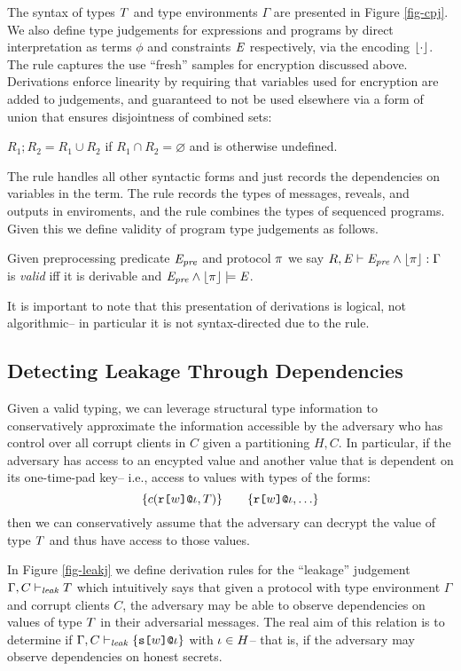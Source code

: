 \cpjfig

The syntax of types $T$ and type environments $\Gamma$ are presented
in Figure \ref{fig-cpj}. We also
define type judgements for expressions and programs by direct
interpretation as terms $\phi$ and constraints $\mathit{E}$ respectively,
via the encoding $\lfloor \cdot \rfloor$. The  rule captures
the use ``fresh'' samples for encryption discussed above. Derivations
enforce linearity by requiring that variables used for encryption
are added to judgements, and guaranteed to not be used elsewhere
via a form of union that ensures disjointness of combined sets:
\begin{definition}
  $R_1;R_2 = R_1 \cup R_2$ if $R_1 \cap R_2 = \varnothing$ and is otherwise
  undefined.
\end{definition}
The  rule handles all other syntactic forms and just
records the dependencies on variables in the term.  The 
rule records the types of messages, reveals, and outputs in
enviroments, and the  rule combines the types of
sequenced programs.  Given this we define validity of program type
judgements as follows. 
\begin{definition}
  Given preprocessing predicate $\mathit{E}_{\mathit{pre}}$ and protocol $\pi$ we say
  $R,\mathit{E} \vdash \mathit{E}_{\mathit{pre}} \wedge \lfloor \pi \rfloor : \Gamma$ is \emph{valid} iff it is derivable and
  $\mathit{E}_{\mathit{pre}} \wedge \lfloor \pi \rfloor \models \mathit{E}$.
\end{definition}
It is important to note that this presentation of derivations is
logical, not algorithmic-- in particular it is not syntax-directed
due to the  rule.

\subsection{Detecting Leakage Through Dependencies}

Given a valid typing, we can leverage structural type information to
conservatively approximate the information accessible by the
adversary who has control over all corrupt clients in $C$ given
a partitioning $H,C$. In particular, if the adversary has access to an
encypted value and another value that is dependent on its one-time-pad
key-- i.e., access to values with types of the forms:
$$
\{ c(\texttt{r[}w\texttt{]}\texttt{@}\iota,T) \} \qquad \{ \texttt{r[}w\texttt{]}\texttt{@}\iota, \ldots \} 
$$
then we can conservatively assume that the adversary can decrypt the
value of type $T$ and thus have access to those values.

In Figure \ref{fig-leakj} we define derivation rules for the
``leakage'' judgement $\Gamma,C \vdash_{\mathit{leak}} T$ which intuitively says
that given a protocol with type environment $\Gamma$ and corrupt
clients $C$, the adversary may be able to observe dependencies on
values of type $T$ in their adversarial messages.  The real aim of
this relation is to determine if
$\Gamma,C \vdash_{\mathit{leak}} \{ \texttt{s[}w\texttt{]}\texttt{@}\iota \}$ with $\iota \in H$-- that is,
if the adversary may observe dependencies on honest secrets.

